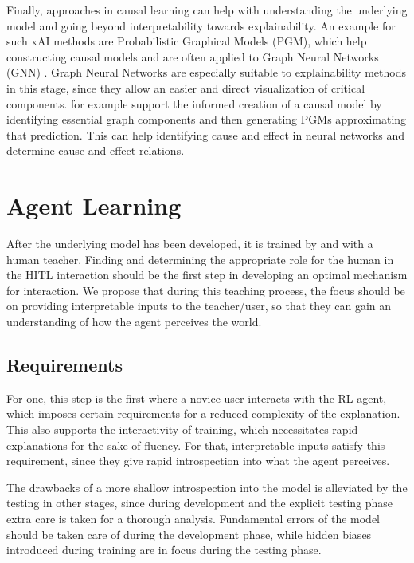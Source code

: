 \documentclass[twoside,11pt]{article}
\begin{document}
Finally, approaches in causal learning can help with understanding the underlying model and going beyond interpretability towards explainability.
An example for such xAI methods are Probabilistic Graphical Models (PGM), which help constructing causal models and are often applied to Graph Neural Networks (GNN) \cite{Saranti:2019:LearningCompetencePGMs}. Graph Neural Networks are especially suitable to explainability methods in this stage, since they allow an easier and direct visualization of critical components. \cite{Vu:2020:PGMExplainer} for example support the informed creation of a causal model by identifying essential graph components and then generating PGMs approximating that prediction. This can help identifying cause and effect in neural networks and determine cause and effect relations.

\section{Agent Learning}

After the underlying model has been developed, it is trained by and with a human teacher.
Finding and determining the appropriate role for the human in the HITL interaction should be the first step in developing an optimal mechanism for interaction. We propose that during this teaching process, the focus should be on providing interpretable inputs to the teacher/user, so that they can gain an understanding of how the agent perceives the world.

\subsection{Requirements}
For one, this step is the first where a novice user interacts with the RL agent, which imposes certain requirements for a reduced complexity of the explanation. This also supports the interactivity of training, which necessitates rapid explanations for the sake of fluency. For that, interpretable inputs satisfy this requirement, since they give rapid introspection into what the agent perceives.

The drawbacks of a more shallow introspection into the model is alleviated by the testing in other stages, since during development and the explicit testing phase extra care is taken for a thorough analysis. Fundamental errors of the model should be taken care of during the development phase, while hidden biases introduced during training are in focus during the testing phase.
\end{document}
